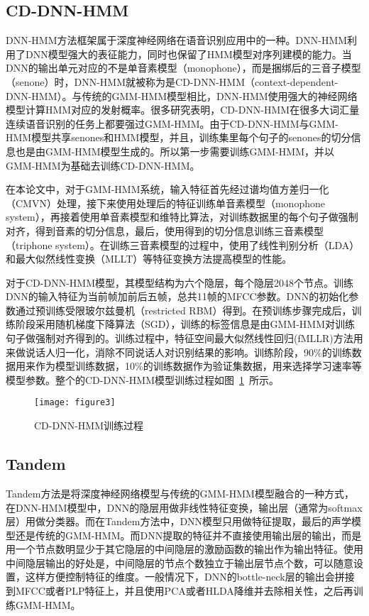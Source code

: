 \subsection{CD-DNN-HMM}
DNN-HMM方法框架属于深度神经网络在语音识别应用中的一种。DNN-HMM利用了DNN模型强大的表征能力，同时也保留了HMM模型对序列建模的能力。当DNN的输出单元对应的不是单音素模型（monophone），而是捆绑后的三音子模型（senone）时，DNN-HMM就被称为是CD-DNN-HMM（context-dependent-DNN-HMM）。与传统的GMM-HMM模型相比，DNN-HMM使用强大的神经网络模型计算HMM对应的发射概率。很多研究表明，CD-DNN-HMM在很多大词汇量连续语音识别的任务上都要强过GMM-HMM\cite{seide2011conversational}\cite{deng2013recent}\cite{yu2013deep}。由于CD-DNN-HMM与GMM-HMM模型共享senones和HMM模型，并且，训练集里每个句子的senones的切分信息也是由GMM-HMM模型生成的。所以第一步需要训练GMM-HMM，并以GMM-HMM为基础去训练CD-DNN-HMM。

在本论文中，对于GMM-HMM系统，输入特征首先经过谱均值方差归一化（CMVN）处理，接下来使用处理后的特征训练单音素模型（monophone system），再接着使用单音素模型和维特比算法，对训练数据里的每个句子做强制对齐，得到音素的切分信息，最后，使用得到的切分信息训练三音素模型（triphone system）。在训练三音素模型的过程中，使用了线性判别分析（LDA）和最大似然线性变换（MLLT）等特征变换方法提高模型的性能。

对于CD-DNN-HMM模型，其模型结构为六个隐层，每个隐层2048个节点。训练DNN的输入特征为当前帧加前后五帧，总共11帧的MFCC参数。DNN的初始化参数通过预训练受限玻尔兹曼机（restricted RBM）得到。在预训练步骤完成后，训练阶段采用随机梯度下降算法（SGD），训练的标签信息是由GMM-HMM对训练句子做强制对齐得到的。训练过程中，特征空间最大似然线性回归(fMLLR)方法用来做说话人归一化，消除不同说话人对识别结果的影响。训练阶段，90\%的训练数据用来作为模型训练数据，10\%的训练数据作为验证集数据，用来选择学习速率等模型参数。整个的CD-DNN-HMM模型训练过程如图~\ref{fig:figure3}~所示。
\begin{figure}[htbp]
\centering
\texttt{[image: figure3]}
\caption{CD-DNN-HMM训练过程}\label{fig:figure3}
\vspace{\baselineskip}
\end{figure}

\subsection{Tandem}
Tandem方法是将深度神经网络模型与传统的GMM-HMM模型融合的一种方式，在DNN-HMM模型中，DNN的隐层用做非线性特征变换，输出层（通常为softmax层）用做分类器。而在Tandem方法中，DNN模型只用做特征提取，最后的声学模型还是传统的GMM-HMM。而DNN提取的特征并不直接使用输出层的输出，而是用一个节点数明显少于其它隐层的中间隐层的激励函数的输出作为输出特征。使用中间隐层输出的好处是，中间隐层的节点个数独立于输出层节点个数，可以随意设置，这样方便控制特征的维度。一般情况下，DNN的bottle-neck层的输出会拼接到MFCC或者PLP特征上，并且使用PCA或者HLDA降维并去除相关性，之后再训练GMM-HMM。

